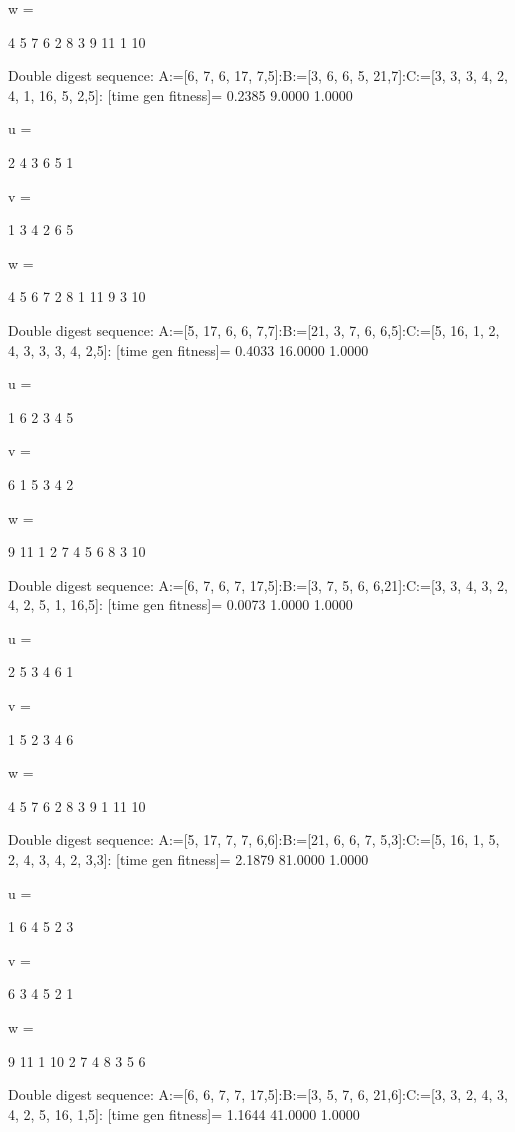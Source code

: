w =

     4     5     7     6     2     8     3     9    11     1    10

Double digest sequence:
A:=[6, 7, 6, 17, 7,5]:B:=[3, 6, 6, 5, 21,7]:C:=[3, 3, 3, 4, 2, 4, 1, 16, 5, 2,5]:
[time gen fitness]=
    0.2385    9.0000    1.0000


u =

     2     4     3     6     5     1


v =

     1     3     4     2     6     5


w =

     4     5     6     7     2     8     1    11     9     3    10

Double digest sequence:
A:=[5, 17, 6, 6, 7,7]:B:=[21, 3, 7, 6, 6,5]:C:=[5, 16, 1, 2, 4, 3, 3, 3, 4, 2,5]:
[time gen fitness]=
    0.4033   16.0000    1.0000


u =

     1     6     2     3     4     5


v =

     6     1     5     3     4     2


w =

     9    11     1     2     7     4     5     6     8     3    10

Double digest sequence:
A:=[6, 7, 6, 7, 17,5]:B:=[3, 7, 5, 6, 6,21]:C:=[3, 3, 4, 3, 2, 4, 2, 5, 1, 16,5]:
[time gen fitness]=
    0.0073    1.0000    1.0000


u =

     2     5     3     4     6     1


v =

     1     5     2     3     4     6


w =

     4     5     7     6     2     8     3     9     1    11    10

Double digest sequence:
A:=[5, 17, 7, 7, 6,6]:B:=[21, 6, 6, 7, 5,3]:C:=[5, 16, 1, 5, 2, 4, 3, 4, 2, 3,3]:
[time gen fitness]=
    2.1879   81.0000    1.0000


u =

     1     6     4     5     2     3


v =

     6     3     4     5     2     1


w =

     9    11     1    10     2     7     4     8     3     5     6

Double digest sequence:
A:=[6, 6, 7, 7, 17,5]:B:=[3, 5, 7, 6, 21,6]:C:=[3, 3, 2, 4, 3, 4, 2, 5, 16, 1,5]:
[time gen fitness]=
    1.1644   41.0000    1.0000


